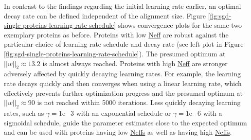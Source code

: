 \documentclass[11pt,a4paper,twoside]{book}
\newcommand{\eq}{\!=\!}
\theoremstyle{definition}
\theoremstyle{definition}
\theoremstyle{remark}
\begin{document}
In contrast to the findings regarding the initial learning rate earlier,
an optimal decay rate can be defined independent of the alignment size.
Figure \ref{fig:sgd-single-proteins-learning-rate-schedule} shows
convergence plots for the same two exemplary proteins as before.
Proteins with low \protect\hyperlink{abbrev}{Neff} are robust against
the particular choice of learning rate schedule and decay rate (see left
plot in Figure \ref{fig:sgd-single-proteins-learning-rate-schedule}).
The presumed optimum at \(||w||_2 \approx 13.2\) is almost always
reached. Proteins with high \protect\hyperlink{abbrev}{Neff} are
stronger adversely affected by quickly decaying learning rates. For
example, the learning rate decays quickly and then converges when using
a linear learning rate, which effectively prevents further optimization
progress and the presumed optimum at \(||w||_2 \approx 90\) is not
reached within 5000 iterations. Less quickly decaying learning rates,
such as \(\gamma \eq 1\mathrm{e}{-3}\) with an exponential schedule or
\(\gamma \eq 1\mathrm{e}{-6}\) with a sigmoidal schedule, guide the
parameter estimates close to the expected optimum and can be used with
proteins having low \protect\hyperlink{abbrev}{Neffs} as well as having
high \protect\hyperlink{abbrev}{Neffs}.
\end{document}
